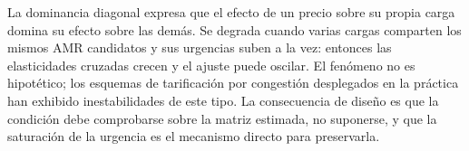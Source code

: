 \begin{observacion}
\label{obs:cascada}
La dominancia diagonal expresa que el efecto de un precio sobre su propia carga
domina su efecto sobre las demás. Se degrada cuando varias cargas comparten los
mismos AMR candidatos y sus urgencias suben a la vez: entonces las elasticidades
cruzadas crecen y el ajuste puede oscilar. El fenómeno no es hipotético; los
esquemas de tarificación por congestión desplegados en la práctica han exhibido
inestabilidades de este tipo. La consecuencia de diseño es que la condición debe
comprobarse sobre la matriz estimada, no suponerse, y que la saturación de la
urgencia es el mecanismo directo para preservarla.
\end{observacion}
